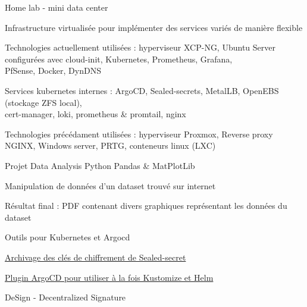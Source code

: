 
\begin{cventries}
  \cventry
    {} %
    {Home lab - mini data center} %
    {} %
    {} %
    {
      \begin{cvitems} %
        \item {Infrastructure virtualisée pour implémenter des services variés de manière flexible}
        \item {Technologies actuellement utilisées : hyperviseur XCP-NG, Ubuntu Server configurées avec cloud-init, Kubernetes, Prometheus, Grafana,\\PfSense, Docker, DynDNS}
        \item {Services kubernetes internes : ArgoCD, Sealed-secrets, MetalLB, OpenEBS (stockage ZFS local),\\cert-manager, loki, prometheus \& promtail, nginx}
        \item {Technologies précédament utilisées : hyperviseur Proxmox, Reverse proxy NGINX, Windows server, PRTG, conteneurs linux (LXC)}
      \end{cvitems}
    }
  \cventry
      {} %
      {Projet Data Analysis Python Pandas \& MatPlotLib} %
      {} %
      {} %
      {
        \begin{cvitems} %
          \item {Manipulation de données d'un dataset trouvé sur internet}
          \item {Résultat final : PDF contenant divers graphiques représentant les données du dataset\\}
        \end{cvitems}
      }
  \cventry
      {} %
      {Outils pour Kubernetes et Argocd} %
      {} %
      {} %
      {
        \begin{cvitems} %
          \item {\href{https://github.com/guillheu/kubernetes-sealed-secrets-key-archiver}{Archivage des clés de chiffrement de Sealed-secret}}
          \item {\href{https://github.com/guillheu/argocd-kustomize-helm-cmp}{Plugin ArgoCD pour utiliser à la fois Kustomize et Helm}}
        \end{cvitems}
      }
  \cventry
    {} %
    {DeSign - Decentralized Signature} %

\end{cventries}
